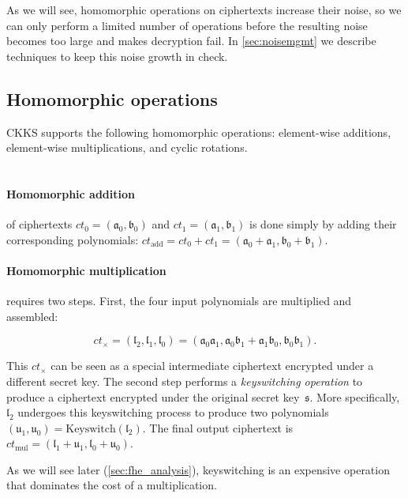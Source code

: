 As we will see, homomorphic operations on ciphertexts increase their noise, so
we can only perform a limited number of operations before the resulting noise
becomes too large and makes decryption fail.  In \autoref{sec:noisemgmt} we
describe techniques to keep this noise growth in check.

\subsection{Homomorphic operations}

CKKS supports the following homomorphic operations: element-wise additions,
element-wise multiplications, and cyclic rotations.

\paragraph{\\Homomorphic addition} of ciphertexts
$ct_0 = (\mathfrak{a}_{0}, \mathfrak{b}_{0})$ and
$ct_1 = (\mathfrak{a}_{1}, \mathfrak{b}_{1})$ is done simply by adding
their corresponding polynomials:
$ct_{\text{add}} = ct_0 + ct_1 = (\mathfrak{a}_0 + \mathfrak{a}_1,
\mathfrak{b}_0 + \mathfrak{b}_1)$.

\paragraph{Homomorphic multiplication} requires two steps.
First, the four input polynomials are multiplied and assembled:

\begin{equation*}
  ct_{\times} = (\mathfrak{l}_2, \mathfrak{l}_1, \mathfrak{l}_0) = (\mathfrak{a}_0\mathfrak{a}_1,
  \mathfrak{a}_0\mathfrak{b}_1 + \mathfrak{a}_1 \mathfrak{b}_0,
  \mathfrak{b}_0\mathfrak{b}_1) .
\end{equation*}

This $ct_{\times}$ can be seen as a special intermediate ciphertext encrypted
under a different secret key. The second step performs a \emph{keyswitch\-ing
op\-era\-tion} to produce a ciphertext encrypted under the original secret
key~$\mathfrak{s}$. More specifically, $\mathfrak{l}_2$ undergoes this
keyswitching process to produce two polynomials $(\mathfrak{u}_1,
\mathfrak{u}_0) = \textrm{Keyswitch}(\mathfrak{l}_2)$.  The final output
ciphertext is $ct_{\text{mul}} = (\mathfrak{l}_1 + \mathfrak{u}_1,
\mathfrak{l}_0 + \mathfrak{u}_0)$.

As we will see later (\autoref{sec:fhe_analysis}), keyswitching is an
expensive operation that dominates the cost of a multiplication.

